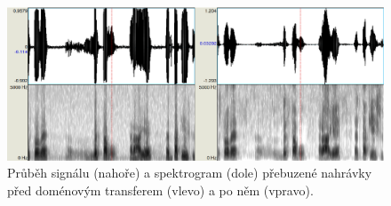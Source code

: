 \begin{figure}[htpb]
\includegraphics[scale=0.4]{rc/gan-overdrive.eps}
\caption{Průběh signálu (nahoře) a spektrogram (dole) přebuzené nahrávky
před doménovým transferem (vlevo) a po něm (vpravo).}
\label{fig:gan:overdrive}
\end{figure}
